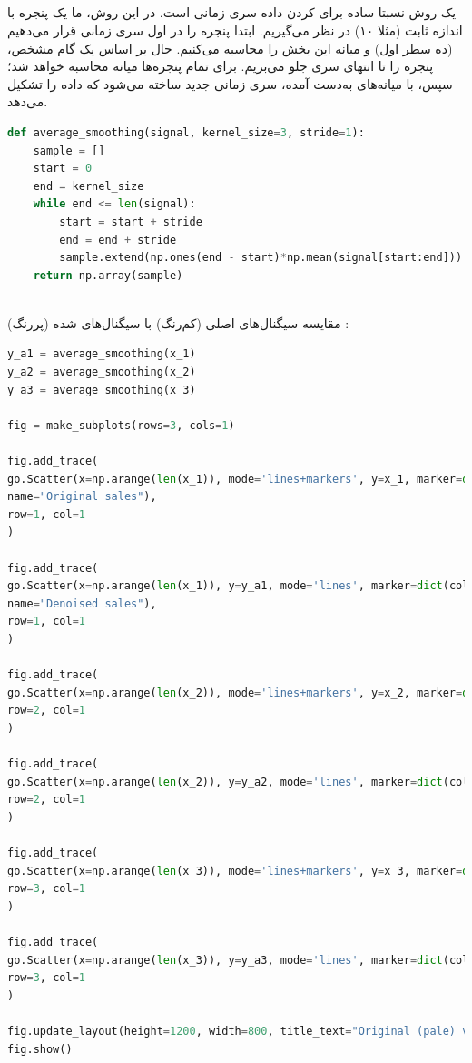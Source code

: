 \documentclass{article}
\begin{document}
\subsection*{}
یک روش نسبتا ساده برای  کردن داده سری‌ زمانی است. در این روش، ما یک پنجره با اندازه ثابت (مثلا ۱۰) در نظر می‌گیریم. ابتدا پنجره را در اول سری‌ زمانی قرار می‌دهیم (ده سطر اول) و میانه این بخش را محاسبه می‌کنیم. حال بر اساس یک گام مشخص، پنجره را تا انتهای سری‌ جلو می‌بریم. برای تمام پنجره‌ها میانه محاسبه خواهد شد؛ سپس، با میانه‌های به‌دست آمده، سری زمانی جدید ساخته می‌شود که داده‌  را تشکیل می‌دهد.
\begin{latin}
\begin{lstlisting}[language=Python]
def average_smoothing(signal, kernel_size=3, stride=1):
	sample = []
	start = 0
	end = kernel_size
	while end <= len(signal):
		start = start + stride
		end = end + stride
		sample.extend(np.ones(end - start)*np.mean(signal[start:end]))
	return np.array(sample)
\end{lstlisting}
\end{latin}
\ \\
مقایسه سیگنال‌های اصلی (کم‌رنگ) با سیگنال‌های  شده (پررنگ) :
\begin{latin}
\begin{lstlisting}[language=Python]
y_a1 = average_smoothing(x_1)
y_a2 = average_smoothing(x_2)
y_a3 = average_smoothing(x_3)

fig = make_subplots(rows=3, cols=1)

fig.add_trace(
go.Scatter(x=np.arange(len(x_1)), mode='lines+markers', y=x_1, marker=dict(color="lightskyblue"), showlegend=False,
name="Original sales"),
row=1, col=1
)

fig.add_trace(
go.Scatter(x=np.arange(len(x_1)), y=y_a1, mode='lines', marker=dict(color="navy"), showlegend=False,
name="Denoised sales"),
row=1, col=1
)

fig.add_trace(
go.Scatter(x=np.arange(len(x_2)), mode='lines+markers', y=x_2, marker=dict(color="thistle"), showlegend=False),
row=2, col=1
)

fig.add_trace(
go.Scatter(x=np.arange(len(x_2)), y=y_a2, mode='lines', marker=dict(color="indigo"), showlegend=False),
row=2, col=1
)

fig.add_trace(
go.Scatter(x=np.arange(len(x_3)), mode='lines+markers', y=x_3, marker=dict(color="mediumaquamarine"), showlegend=False),
row=3, col=1
)

fig.add_trace(
go.Scatter(x=np.arange(len(x_3)), y=y_a3, mode='lines', marker=dict(color="darkgreen"), showlegend=False),
row=3, col=1
)

fig.update_layout(height=1200, width=800, title_text="Original (pale) vs. Denoised (dark) signals")
fig.show()
\end{lstlisting}
\end{latin}
\end{document}
